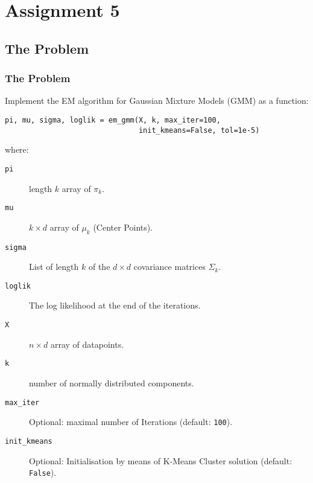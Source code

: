 \documentclass[11pt]{beamer}
\begin{document}
    \section{Assignment 5}
    \subsection{The Problem}
    \begin{frame}[fragile=singleslide]
        \frametitle{The Problem}
        Implement the EM algorithm for Gaussian Mixture Models (GMM) as a function:
        \begin{verbatim}
pi, mu, sigma, loglik = em_gmm(X, k, max_iter=100,
                               init_kmeans=False, tol=1e-5)
        \end{verbatim}
        where:
        \scriptsize{
            \begin{description}
                \item [\texttt{pi}] length $k$ array of $\pi_k$.
                \item [\texttt{mu}] $k \times d$ array of $\mu_k$ (Center Points).
                \item [\texttt{sigma}] List of length $k$ of the $d \times d$ covariance matrices $\Sigma_k$.
                \item [\texttt{loglik}] The log likelihood at the end of the iterations.
                \item [\texttt{X}] $n \times d$ array of datapoints.
                \item [\texttt{k}] number of normally distributed components.
                \item [\texttt{max\_iter}] Optional: maximal number of Iterations (default: \texttt{100}).
                \item [\texttt{init\_kmeans}] Optional: Initialisation by means of K-Means Cluster solution (default: \texttt{False}).
            \end{description}
        }
        \normalsize
   \end{frame}
\end{document}
